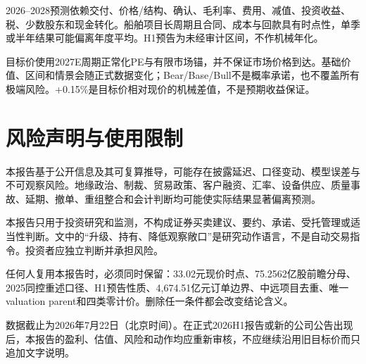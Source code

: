2026--2028预测依赖交付、价格/结构、确认、毛利率、费用、减值、投资收益、税、少数股东和现金转化。船舶项目长周期且合同、成本与回款具有时点性，单季或半年结果可能偏离年度平均。H1预告为未经审计区间，不作机械年化。

目标价使用2027E周期正常化PE与有限市场锚，并不保证市场价格到达。基础价值、区间和情景会随正式数据变化；Bear/Base/Bull不是概率承诺，也不覆盖所有极端风险。+0.15\%是目标价相对现价的机械差值，不是预期收益保证。

\section{风险声明与使用限制}

本报告基于公开信息及其可复算推导，可能存在披露延迟、口径变动、模型误差与不可观察风险。地缘政治、制裁、贸易政策、客户融资、汇率、设备供应、质量事故、延期、撤单、重组整合和会计判断均可能使实际结果显著偏离预测。

本报告只用于投资研究和监测，不构成证券买卖建议、要约、承诺、受托管理或适当性判断。文中的“升级、持有、降低观察敞口”是研究动作语言，不是自动交易指令。投资者应独立判断并承担风险。

\begin{keyinsight}[复核原则]
任何人复用本报告时，必须同时保留：33.02元现价时点、75.2562亿股前瞻分母、2025同控重述口径、H1预告性质、4,674.51亿元订单边界、中远项目去重、唯一valuation parent和四类零计价。删除任一条件都会改变结论含义。
\end{keyinsight}

数据截止为2026年7月22日（北京时间）。在正式2026H1报告或新的公司公告出现后，本报告的盈利、估值、风险和动作均应重新审核，不应继续沿用旧目标价而只追加文字说明。
